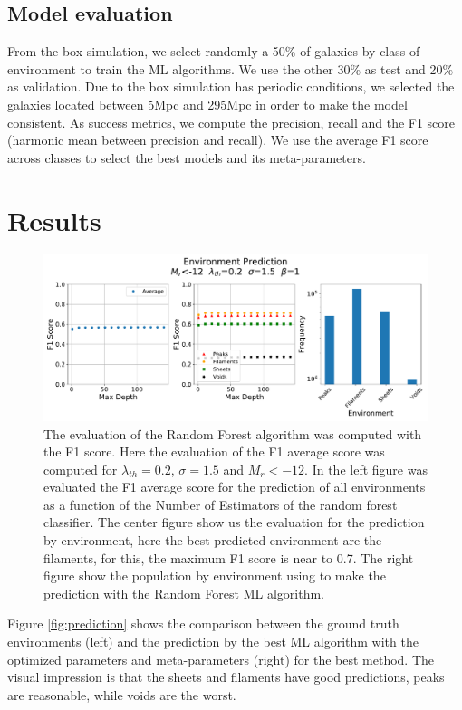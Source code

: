 \documentclass[usenatbib]{mnras}
\begin{document}
\subsection{Model evaluation}


From the box simulation, we select randomly a 50$\%$ of galaxies by class of environment to train the ML algorithms. We use the other 30$\%$ as test and  20$\%$ as validation. Due to the box simulation has periodic conditions, we selected the galaxies located between 5Mpc and 295Mpc in order to make the model consistent.  
As success metrics, we compute the precision, recall and the F1 score (harmonic mean between precision and recall).
We use the average F1 score across classes to select the best models and its meta-parameters.

\section{Results}\label{sec:results}

\begin{figure}
    \includegraphics[scale=0.43]{Figs/p_F1_curve_Forest.pdf}
    \caption{The evaluation of the Random Forest algorithm was computed with the F1 score. Here the evaluation of the F1 average score  was computed for $\lambda_{th}=0.2$, $\sigma=1.5$ and $M_r<-12$.  In the left figure was evaluated the F1 average score for the prediction of all environments as a function of the Number of Estimators of the random forest classifier. The center figure show us the evaluation for the prediction by environment, here the best predicted environment are the filaments, for this, the maximum F1 score is near to 0.7. The right figure show the population by environment using to make the prediction with the Random Forest ML algorithm.}
    \label{fig:F1_curve}
\end{figure}


Figure \ref{fig:prediction} shows the comparison between the ground truth environments (left) and the prediction by the best ML algorithm with the optimized parameters and meta-parameters (right) for the best method.
The visual impression is that the sheets and filaments have good predictions,
peaks are reasonable, while voids are the worst.
\end{document}
